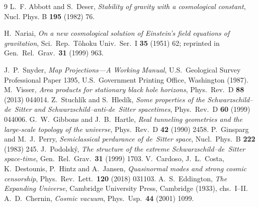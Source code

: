 \documentclass[11pt,a4paper]{article}
\theoremstyle{definition}
\begin{document}
\begin{thebibliography}{9}
L.~F. Abbott and S.~Deser,
\emph{Stability of gravity with a cosmological constant},
Nucl. Phys. B \textbf{195} (1982) 76.

 H.~Nariai, \emph{On a new cosmological solution of Einstein's field equations of gravitation}, Sci.\ Rep.\ T\^ohoku Univ.\ Ser.\ I \textbf{35} (1951) 62; reprinted in Gen.\ Rel.\ Grav.\ \textbf{31} (1999) 963.

 J.~P.~Snyder, \emph{Map Projections---A Working Manual}, U.S.\ Geological Survey Professional Paper 1395, U.S.\ Government Printing Office, Washington (1987).
 M.~Visser, \emph{Area products for stationary black hole horizons}, Phys.\ Rev.\ D \textbf{88} (2013) 044014.
 Z.~Stuchl\'ik and S.~Hled\'ik, \emph{Some properties of the Schwarzschild--de~Sitter and Schwarzschild--anti-de~Sitter spacetimes}, Phys.\ Rev.\ D \textbf{60} (1999) 044006.
 G.~W.~Gibbons and J.~B.~Hartle, \emph{Real tunneling geometries and the large-scale topology of the universe}, Phys.\ Rev.\ D \textbf{42} (1990) 2458.
 P.~Ginsparg and M.~J.~Perry, \emph{Semiclassical perdurance of de~Sitter space}, Nucl.\ Phys.\ B \textbf{222} (1983) 245.
 J.~Podolsk\'y, \emph{The structure of the extreme Schwarzschild--de~Sitter space-time}, Gen.\ Rel.\ Grav.\ \textbf{31} (1999) 1703.
 V.~Cardoso, J.~L.~Costa, K.~Destounis, P.~Hintz and A.~Jansen, \emph{Quasinormal modes and strong cosmic censorship}, Phys.\ Rev.\ Lett.\ \textbf{120} (2018) 031103.
 A.~S.~Eddington, \emph{The Expanding Universe}, Cambridge University Press, Cambridge (1933), chs.~I--II.
 A.~D.~Chernin, \emph{Cosmic vacuum}, Phys.\ Usp.\ \textbf{44} (2001) 1099.
\end{thebibliography}



\end{document}
